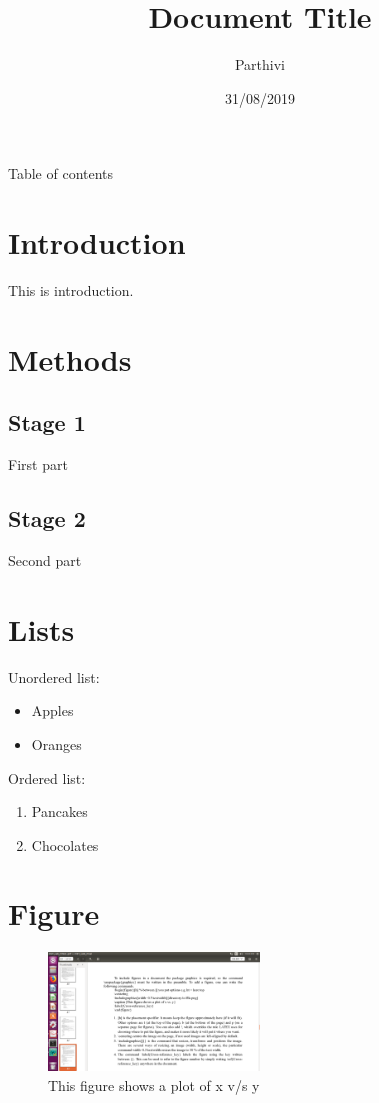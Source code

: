 \documentclass[a4paper,12pt]{article}
\begin{document}
\title{Document Title}
\author{Parthivi}
\date{31/08/2019}
\maketitle

\newpage
{}
Table of contents
\newpage
{}

\section{Introduction}
This is introduction.

\section{Methods}
\subsection{Stage 1}
\label{subsec1}
First part
\subsection{Stage 2}
\label{subsec2}
Second part

\section{Lists}
Unordered list:
\begin{itemize}
\item Apples
\item Oranges
\end{itemize}
Ordered list:
\begin{enumerate}
\item Pancakes
\item Chocolates
\end{enumerate}

\section{Figure}
\begin{figure}[h]
\centering
\includegraphics[width=0.5\textwidth]{figure.png}
\caption{This figure shows a plot of x v/s y}
\label{crossref_key}
\end{figure}
\end{document}
